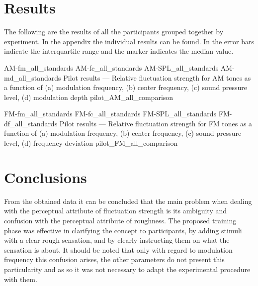 \documentclass[../main.tex]{subfiles}
\begin{document}
\section{Results}

The following are the results of all the participants grouped together by
experiment. In the appendix the individual results can be found. In
 the error bars
indicate the interquartile range and the marker indicates the median value.

\begin{pilotresults}

\myfigurequadlabeled%
  {AM-fm_all_standards}
  {AM-fc_all_standards}
  {AM-SPL_all_standards}
  {AM-md_all_standards}
  {Pilot results --- Relative fluctuation strength for AM tones as a function
    of (a) modulation frequency, (b) center frequency, (c) sound pressure level,
    (d) modulation depth}
  {pilot_AM_all_comparison}

\myfigurequadlabeled%
  {FM-fm_all_standards}
  {FM-fc_all_standards}
  {FM-SPL_all_standards}
  {FM-df_all_standards}
  {Pilot results --- Relative fluctuation strength for FM tones as a function of
    (a) modulation frequency, (b) center frequency, (c) sound pressure level,
    (d) frequency deviation}
  {pilot_FM_all_comparison}

\end{pilotresults}

\section{Conclusions}

From the obtained data it can be concluded that the main problem when dealing
with the perceptual attribute of fluctuation strength is its ambiguity and
confusion with the perceptual attribute of roughness. The proposed training
phase was effective in clarifying the concept to participants, by adding stimuli
with a clear rough sensation, and by clearly instructing them on what the
sensation is about. It should be noted that only with regard to modulation
frequency this confusion arises, the other parameters do not present this
particularity and as so it was not necessary to adapt the experimental procedure
with them.
\end{document}
